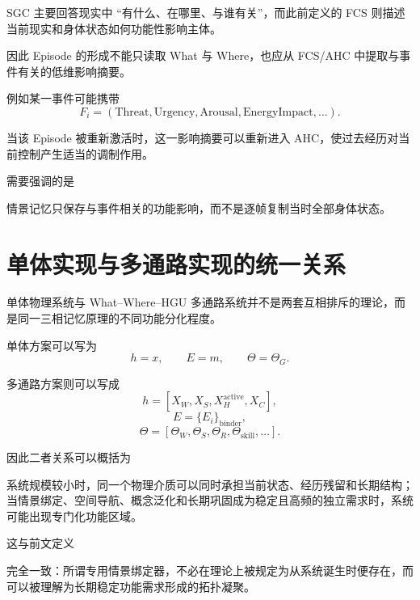 SGC 主要回答现实中 ``有什么、在哪里、与谁有关''，而此前定义的 FCS 则描述当前现实和身体状态如何功能性影响主体。

因此 Episode 的形成不能只读取 What 与 Where，也应从 FCS/AHC 中提取与事件有关的低维影响摘要。

例如某一事件可能携带
\[
F_i=
(
\mathrm{Threat},
\mathrm{Urgency},
\mathrm{Arousal},
\mathrm{EnergyImpact},
\ldots
).
\]

当该 Episode 被重新激活时，这一影响摘要可以重新进入 AHC，使过去经历对当前控制产生适当的调制作用。

需要强调的是
\begin{statementbox}
\centering
{}
\end{statementbox}

情景记忆只保存与事件相关的功能影响，而不是逐帧复制当时全部身体状态。

\section{单体实现与多通路实现的统一关系}

单体物理系统与 What--Where--HGU 多通路系统并不是两套互相排斥的理论，而是同一三相记忆原理的不同功能分化程度。

单体方案可以写为
\[
h=x,
\qquad
E=m,
\qquad
\Theta=\Theta_G.
\]

多通路方案则可以写成
\[
h=
[
X_W,
X_S,
X_H^{\mathrm{active}},
X_C
],
\]
\[
E=
\{E_i\}_{\mathrm{binder}},
\]
\[
\Theta=
[
\Theta_W,
\Theta_S,
\Theta_R,
\Theta_{\mathrm{skill}},
\ldots
].
\]

因此二者关系可以概括为
\begin{statementbox}
\centering
{}
\end{statementbox}

系统规模较小时，同一个物理介质可以同时承担当前状态、经历残留和长期结构；当情景绑定、空间导航、概念泛化和长期巩固成为稳定且高频的独立需求时，系统可能出现专门化功能区域。

这与前文定义
\begin{statementbox}
\centering
{}
\end{statementbox}
完全一致：所谓专用情景绑定器，不必在理论上被规定为从系统诞生时便存在，而可以被理解为长期稳定功能需求形成的拓扑凝聚。

